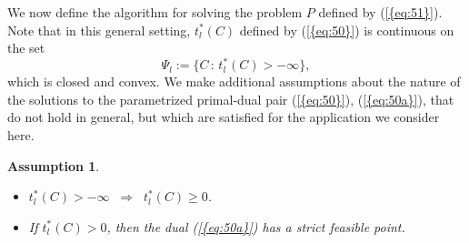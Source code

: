 \documentclass{siamltex}
\newtheorem{assumption}{Assumption}
\begin{document}
We now define the algorithm for solving the problem $P$ defined by
{(\ref{{eq:51}})}.
Note that in this general setting, $t^*_l(C)$ defined by
{(\ref{{eq:50}})} is continuous on the set
\[
\Psi_l := \{ C \, : \, t^*_l(C)>-\infty \},
\]
which is closed and convex.
We make additional assumptions about the nature of the solutions
to the parametrized primal-dual pair {(\ref{{eq:50}})}, {(\ref{{eq:50a}})},
that do not hold in general, but which are satisfied for the
application we consider here.

\begin{assumption} \label{ass:sdpo} 
\begin{itemize}
\item[(i)] $t^*_l(C) > -\infty \;\; \Rightarrow \;\; t^*_l(C) \ge 0$.
\item[(ii)] If $t^*_l(C)>0$, then the dual {(\ref{{eq:50a}})} has a strict
  feasible point.
\end{itemize}
\end{assumption}
\end{document}
